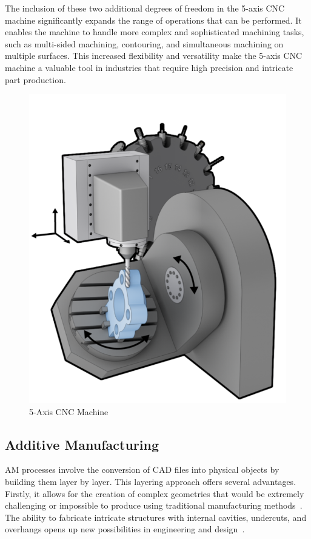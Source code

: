 The inclusion of these two additional degrees of freedom in the 5-axis CNC machine significantly expands the range of operations that can be performed. It enables the machine to handle more complex and sophisticated machining tasks, such as multi-sided machining, contouring, and simultaneous machining on multiple surfaces. This increased flexibility and versatility make the 5-axis CNC machine a valuable tool in industries that require high precision and intricate part production.

\begin{figure}[H]
	\centerline{\includegraphics[scale=.45]{figures/5ax.png}}
	\caption{5-Axis CNC Machine \cite{5ax}}
	\label{5ax}
\end{figure}



\subsection{Additive Manufacturing}
AM processes involve the conversion of CAD files into physical objects by building them layer by layer. This layering approach offers several advantages. Firstly, it allows for the creation of complex geometries that would be extremely challenging or impossible to produce using traditional manufacturing methods~\cite{Prakash.2018}. The ability to fabricate intricate structures with internal cavities, undercuts, and overhangs opens up new possibilities in engineering and design~\cite{Abdulhameed.2019}.

